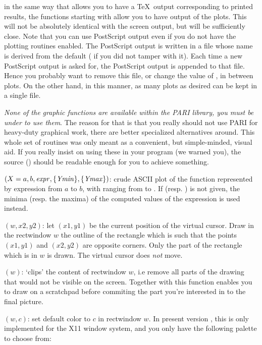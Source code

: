  in the same way that  allows you to have a \TeX\ output
corresponding to printed results, the functions starting with  allow
you to have  output of the plots. This will not be absolutely
identical with the screen output, but will be sufficiently close. Note that
you can use PostScript output even if you do not have the plotting routines
enabled. The PostScript output is written in a file whose name is derived from
the  default ( if you did not tamper with it). Each
time a new PostScript output is asked for, the PostScript output is appended
to that file. Hence you probably want to remove this file, or change the value
of , in between plots. On the other hand, in this manner, as many
plots as desired can be kept in a single file. \smallskip

 \emph{None of the graphic functions are available
within the PARI library, you must be under  to use them}. The reason
for that is that you really should not use PARI for heavy-duty graphical work,
there are better specialized alternatives around. This whole set of routines
was only meant as a convenient, but simple-minded, visual aid. If you really
insist on using these in your program (we warned you), the source
() should be readable enough for you to achieve something.

$(X=a,b,\hbox{\it expr\/},\{\hbox{\it Ymin\/}\},\{\hbox{\it Ymax\/}\})$: crude
ASCII plot of the function represented by expression  from
$a$ to $b$, with  ranging from  to . If
 (resp. ) is not given, the minima (resp. the
maxima) of the computed values of the expression is used instead.

$(w,x2,y2)$: let $(x1,y1)$ be the current position of the
virtual cursor. Draw in the rectwindow $w$ the outline of the rectangle which
is such that the points $(x1,y1)$ and $(x2,y2)$ are opposite corners. Only
the part of the rectangle which is in $w$ is drawn. The virtual cursor does
\emph{not} move.

$(w)$: `clips' the content of rectwindow $w$, i.e
remove all parts of the drawing that would not be visible on the screen.
Together with  this function enables you to draw on a
scratchpad before commiting the part you're interested in to the final
picture.

$(w,c)$: set default color to $c$ in rectwindow $w$.
In present version \vers, this is only implemented for the X11 window system,
and you only have the following palette to choose from:

